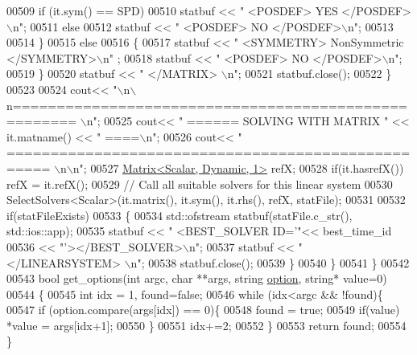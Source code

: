 \begin{DoxyCode}
00509         \textcolor{keywordflow}{if} (it.sym() == SPD) 
00510           statbuf << \textcolor{stringliteral}{"     <POSDEF> YES </POSDEF>\(\backslash\)n"}; 
00511         \textcolor{keywordflow}{else} 
00512           statbuf << \textcolor{stringliteral}{"     <POSDEF> NO </POSDEF>\(\backslash\)n"}; 
00513           
00514       \}
00515       \textcolor{keywordflow}{else}
00516       \{
00517         statbuf << \textcolor{stringliteral}{"     <SYMMETRY> NonSymmetric </SYMMETRY>\(\backslash\)n"} ; 
00518         statbuf << \textcolor{stringliteral}{"     <POSDEF> NO </POSDEF>\(\backslash\)n"}; 
00519       \}
00520       statbuf << \textcolor{stringliteral}{"   </MATRIX> \(\backslash\)n"};
00521       statbuf.close();
00522     \}
00523     
00524     cout<< \textcolor{stringliteral}{"\(\backslash\)n\(\backslash\)n===================================================== \(\backslash\)n"};
00525     cout<< \textcolor{stringliteral}{" ======  SOLVING WITH MATRIX "} << it.matname() << \textcolor{stringliteral}{" ====\(\backslash\)n"};
00526     cout<< \textcolor{stringliteral}{" =================================================== \(\backslash\)n\(\backslash\)n"};
00527     \hyperlink{group___core___module}{Matrix<Scalar, Dynamic, 1>} refX;
00528     \textcolor{keywordflow}{if}(it.hasrefX()) refX = it.refX();
00529     \textcolor{comment}{// Call all suitable solvers for this linear system }
00530     SelectSolvers<Scalar>(it.matrix(), it.sym(), it.rhs(), refX, statFile);
00531     
00532     \textcolor{keywordflow}{if}(statFileExists)
00533     \{
00534       std::ofstream statbuf(statFile.c\_str(), std::ios::app);
00535       statbuf << \textcolor{stringliteral}{"  <BEST\_SOLVER ID='"}<< best\_time\_id
00536               << \textcolor{stringliteral}{"'></BEST\_SOLVER>\(\backslash\)n"}; 
00537       statbuf << \textcolor{stringliteral}{" </LINEARSYSTEM> \(\backslash\)n"}; 
00538       statbuf.close();
00539     \}
00540   \} 
00541 \} 
00542 
00543 \textcolor{keywordtype}{bool} get\_options(\textcolor{keywordtype}{int} argc, \textcolor{keywordtype}{char} **args, \textcolor{keywordtype}{string} \hyperlink{structoption}{option}, \textcolor{keywordtype}{string}* value=0)
00544 \{
00545   \textcolor{keywordtype}{int} idx = 1, found=\textcolor{keyword}{false}; 
00546   \textcolor{keywordflow}{while} (idx<argc && !found)\{
00547     \textcolor{keywordflow}{if} (option.compare(args[idx]) == 0)\{
00548       found = \textcolor{keyword}{true}; 
00549       \textcolor{keywordflow}{if}(value) *value = args[idx+1];
00550     \}
00551     idx+=2;
00552   \}
00553   \textcolor{keywordflow}{return} found; 
00554 \}
\end{DoxyCode}
